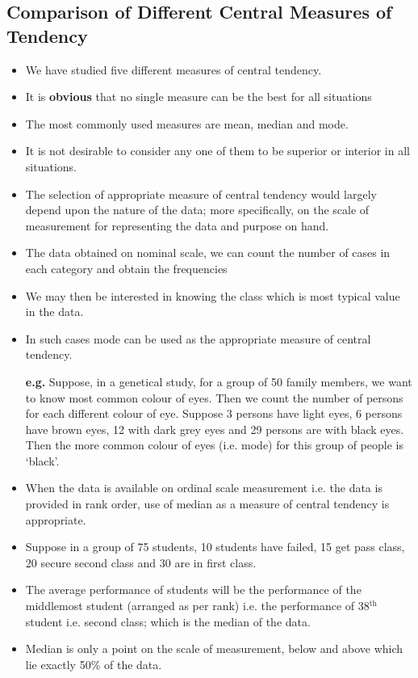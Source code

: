\documentclass[
10pt, %
a4paper, %
]{report}
\begin{document}
\subsection*{Comparison of Different Central Measures of Tendency}
\begin{itemize}
\item We have studied five different measures of central tendency.
\item It is \textbf{obvious} that no single measure can be the best for all situations
\item The most commonly used measures are mean, median and mode.
\item It is not desirable to consider any one of them to be superior or interior in all situations.
\item The selection of appropriate measure of central tendency would largely depend upon the nature of the data; more specifically, on the scale of measurement for representing the data and purpose on hand.
\item The data obtained on nominal scale, we can count the number of cases in each category and obtain the frequencies
\item We may then be interested in knowing the class which is most typical value in the data.
\item In such cases mode can be used as the appropriate measure of
central tendency.
\item[\textbf{e.g.}] Suppose, in a genetical study, for a group of 50 family members, we want to know most common colour of eyes. Then we count the number of persons for each different colour of eye. Suppose 3 persons have light eyes, 6 persons have brown eyes, 12 with dark grey eyes and 29 persons are with black eyes. Then the more common colour of eyes (i.e. mode) for this group of people is ‘black’.
\item When the data is available on ordinal scale measurement i.e. the data is provided in rank order, use of median as a measure of central tendency is appropriate.
\item Suppose in a group of 75 students, 10 students have failed, 15 get pass class, 20 secure second class and 30 are in first class.
\item The average performance of students will be the performance of the middlemost student (arranged as per rank) i.e. the performance of 38\(^\text{th}\) student i.e. second class; which is the median of the data.
\item Median is only a point on the scale of measurement, below and above which lie exactly 50\% of the data.

\end{itemize}
\end{document}
